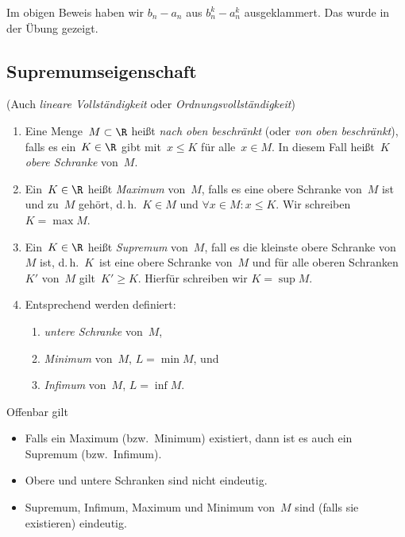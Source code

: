 \documentclass[a4paper]{article}
\begin{document}
Im obigen Beweis haben wir $b_n - a_n$ aus $b_n^k - a_n^k$ ausgeklammert. Das wurde in der Übung gezeigt.


\subsection{Supremumseigenschaft}

(Auch \emph{lineare Vollständigkeit} oder \emph{Ordnungsvollständigkeit})

\begin{definition}\leavevmode
    \begin{enumerate}
        \item Eine Menge~$M \subset \R$ heißt \emph{nach oben beschränkt} (oder \emph{von oben beschränkt}), falls es ein~$K \in \R$ gibt mit~$x \leq K$ für alle~$x \in M$. In diesem Fall heißt~$K$ \emph{obere Schranke} von~$M$.
        \item Ein~$K \in \R$ heißt \emph{Maximum} von~$M$, falls es eine obere Schranke von~$M$ ist und zu~$M$ gehört, d.\,h.\ $K \in M$ und $\forall x \in M\colon x \leq K$. Wir schreiben $K = \max M$.
        \item Ein~$K \in \R$ heißt \emph{Supremum} von~$M$, fall es die kleinste obere Schranke von~$M$ ist, d.\,h.\ $K$~ist eine obere Schranke von~$M$ und für alle oberen Schranken~$K'$ von~$M$ gilt~$K' \geq K$. Hierfür schreiben wir $K = \sup M$.
        \item Entsprechend werden definiert:
              \begin{enumerate}
                  \item \emph{untere Schranke} von~$M$,
                  \item \emph{Minimum} von~$M$, $L = \min M$, und
                  \item \emph{Infimum} von~$M$, $L = \inf M$.
              \end{enumerate}
    \end{enumerate}
\end{definition}

\begin{remark}
    Offenbar gilt
    \begin{itemize}
        \item Falls ein Maximum (bzw.\ Minimum) existiert, dann ist es auch ein Supremum (bzw.\ Infimum).
        \item Obere und untere Schranken sind nicht eindeutig.
        \item Supremum, Infimum, Maximum und Minimum von~$M$ sind (falls sie existieren) eindeutig.
    \end{itemize}
\end{remark}
\end{document}
